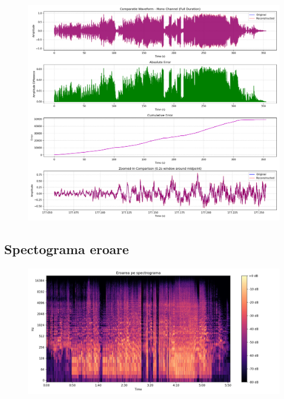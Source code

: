 \documentclass[12pt]{article}
\begin{document}
\begin{figure}[h!]
    \centering
    \includegraphics[width=1\textwidth]{waveform_comparison.png}
\end{figure}

\newpage

\subsection{Spectograma eroare}

\begin{figure}[h!]
    \centering
    \includegraphics[width=1\textwidth]{spectograma_eroare.jpeg}
\end{figure}
\end{document}
